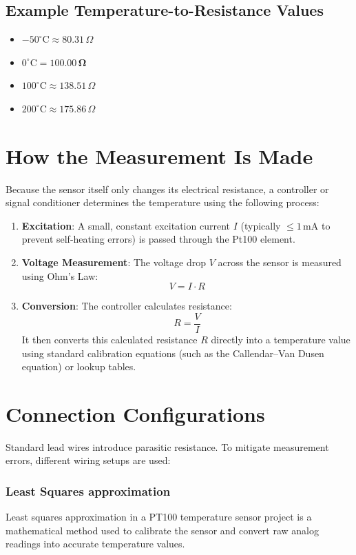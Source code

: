 \documentclass[12pt, a4paper]{article}
\begin{document}
	\subsection*{Example Temperature-to-Resistance Values}
	\begin{itemize}
		\item $-50^\circ\text{C} \approx 80.31\,\Omega$
		\item $0^\circ\text{C} = \mathbf{100.00\,\Omega}$
		\item $100^\circ\text{C} \approx 138.51\,\Omega$
		\item $200^\circ\text{C} \approx 175.86\,\Omega$
	\end{itemize}
	
	\section*{How the Measurement Is Made}
	
	Because the sensor itself only changes its electrical resistance, a controller or signal conditioner determines the temperature using the following process:
	
	\begin{enumerate}
		\item \textbf{Excitation}: A small, constant excitation current $I$ (typically $\le 1\,\text{mA}$ to prevent self-heating errors) is passed through the Pt100 element.
		\item \textbf{Voltage Measurement}: The voltage drop $V$ across the sensor is measured using Ohm's Law:
		\[
		V = I \cdot R
		\]
		\item \textbf{Conversion}: The controller calculates resistance:
		\[
		R = \frac{V}{I}
		\]
		It then converts this calculated resistance $R$ directly into a temperature value using standard calibration equations (such as the Callendar--Van Dusen equation) or lookup tables.
	\end{enumerate}
	
	\section*{Connection Configurations}
	
	Standard lead wires introduce parasitic resistance. To mitigate measurement errors, different wiring setups are used:
	
	
	
	\subsubsection{Least Squares approximation}
	Least squares approximation in a PT100 temperature sensor project is a mathematical method used to calibrate the sensor and convert raw analog readings into accurate temperature values.
	
\end{document}
